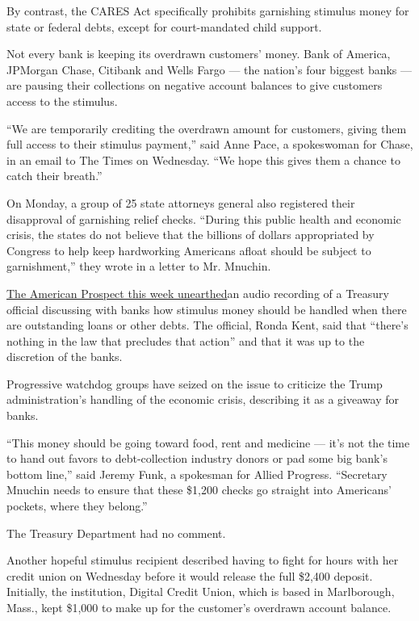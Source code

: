By contrast, the CARES Act specifically prohibits garnishing stimulus
money for state or federal debts, except for court-mandated child
support.

Not every bank is keeping its overdrawn customers' money. Bank of
America, JPMorgan Chase, Citibank and Wells Fargo --- the nation's four
biggest banks --- are pausing their collections on negative account
balances to give customers access to the stimulus.

``We are temporarily crediting the overdrawn amount for customers,
giving them full access to their stimulus payment,'' said Anne Pace, a
spokeswoman for Chase, in an email to The Times on Wednesday. ``We hope
this gives them a chance to catch their breath.''

On Monday, a group of 25 state attorneys general also registered their
disapproval of garnishing relief checks. ``During this public health and
economic crisis, the states do not believe that the billions of dollars
appropriated by Congress to help keep hardworking Americans afloat
should be subject to garnishment,'' they wrote in a letter to Mr.
Mnuchin.

\href{https://prospect.org/coronavirus/banks-can-grab-stimulus-check-pay-debts/}{The
American Prospect this week unearthed}an audio recording of a Treasury
official discussing with banks how stimulus money should be handled when
there are outstanding loans or other debts. The official, Ronda Kent,
said that ``there's nothing in the law that precludes that action'' and
that it was up to the discretion of the banks.

Progressive watchdog groups have seized on the issue to criticize the
Trump administration's handling of the economic crisis, describing it as
a giveaway for banks.

``This money should be going toward food, rent and medicine --- it's not
the time to hand out favors to debt-collection industry donors or pad
some big bank's bottom line,'' said Jeremy Funk, a spokesman for Allied
Progress. ``Secretary Mnuchin needs to ensure that these \$1,200 checks
go straight into Americans' pockets, where they belong.''

The Treasury Department had no comment.

Another hopeful stimulus recipient described having to fight for hours
with her credit union on Wednesday before it would release the full
\$2,400 deposit. Initially, the institution, Digital Credit Union, which
is based in Marlborough, Mass., kept \$1,000 to make up for the
customer's overdrawn account balance.

